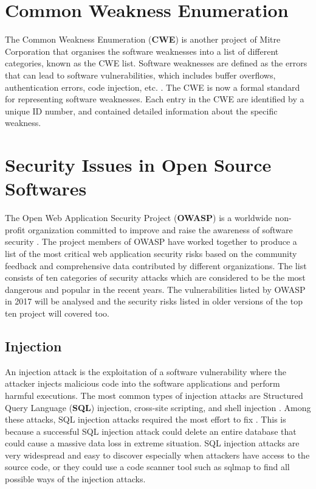 \documentclass[12pt, a4paper]{report}
\begin{document}
\section{Common Weakness Enumeration}
The Common Weakness Enumeration (\textbf{CWE}) is another project of Mitre Corporation \cite{cwe}
that organises the software weaknesses into a list of different categories, known as the CWE list.
Software weaknesses are defined as the errors that can lead to software vulnerabilities, which
includes buffer overflows, authentication errors, code injection, etc. \cite{cwe_faq}. The CWE is
now a formal standard for representing software weaknesses. Each entry in the CWE are identified by
a unique ID number, and contained detailed information about the specific weakness.

\section{Security Issues in Open Source Softwares}
The Open Web Application Security Project (\textbf{OWASP}) is a worldwide non-profit organization
committed to improve and raise the awareness of software security \cite{owasp_home}. The project
members of OWASP have worked together to produce a list of the most critical web application
security risks based on the community feedback and comprehensive data contributed by different
organizations. The list consists of ten categories of security attacks which are considered to be
the most dangerous and popular in the recent years. The vulnerabilities listed by OWASP in 2017
\cite{owasp_top10} will be analysed and the security risks listed in older versions of the top ten
project will covered too.

\subsection{Injection}
An injection attack is the exploitation of a software vulnerability where the attacker injects
malicious code into the software applications and perform harmful executions. The most common types
of injection attacks are Structured Query Language (\textbf{SQL}) injection, cross-site scripting,
and shell injection \cite{pietraszek_2006}. Among these attacks, SQL injection attacks required the
most effort to fix \cite{othmane_2015}. This is because a successful SQL injection attack could
delete an entire database that could cause a massive data loss in extreme situation. SQL injection
attacks are very widespread and easy to discover especially when attackers have access to the source
code, or they could use a code scanner tool such as sqlmap \cite{sqlmap} to find all possible ways
of the injection attacks.
\end{document}
